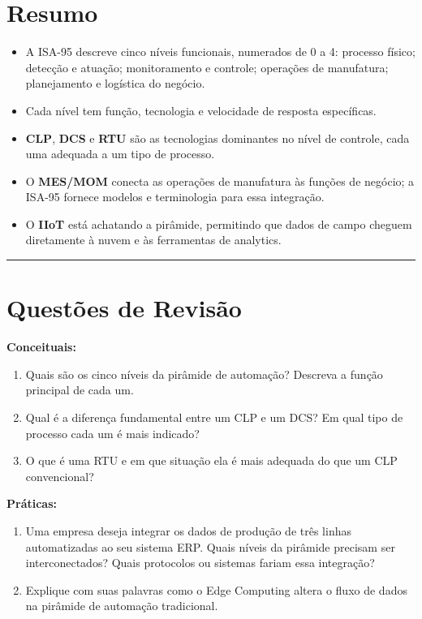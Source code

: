 \section{Resumo}\label{resumo}

\begin{itemize}
\tightlist
\item
  A ISA-95 descreve cinco níveis funcionais, numerados de 0 a 4: processo físico; detecção e atuação; monitoramento e controle; operações de manufatura; planejamento e logística do negócio.
\item
  Cada nível tem função, tecnologia e velocidade de resposta específicas.
\item
  \textbf{CLP}, \textbf{DCS} e \textbf{RTU} são as tecnologias dominantes no nível de controle, cada uma adequada a um tipo de processo.
\item
  O \textbf{MES/MOM} conecta as operações de manufatura às funções de negócio; a ISA-95 fornece modelos e terminologia para essa integração.
\item
  O \textbf{IIoT} está achatando a pirâmide, permitindo que dados de campo cheguem diretamente à nuvem e às ferramentas de analytics.
\end{itemize}

\begin{center}\rule{0.5\linewidth}{0.5pt}\end{center}

\section{Questões de Revisão}\label{questuxf5es-de-revisuxe3o}

\textbf{Conceituais:}

\begin{enumerate}
\def\labelenumi{\arabic{enumi}.}
\tightlist
\item
  Quais são os cinco níveis da pirâmide de automação? Descreva a função principal de cada um.
\item
  Qual é a diferença fundamental entre um CLP e um DCS? Em qual tipo de processo cada um é mais indicado?
\item
  O que é uma RTU e em que situação ela é mais adequada do que um CLP convencional?
\end{enumerate}

\textbf{Práticas:}

\begin{enumerate}
\def\labelenumi{\arabic{enumi}.}
\setcounter{enumi}{3}
\tightlist
\item
  Uma empresa deseja integrar os dados de produção de três linhas automatizadas ao seu sistema ERP. Quais níveis da pirâmide precisam ser interconectados? Quais protocolos ou sistemas fariam essa integração?
\item
  Explique com suas palavras como o Edge Computing altera o fluxo de dados na pirâmide de automação tradicional.
\end{enumerate}

